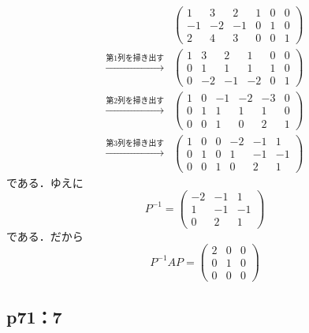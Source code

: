 \documentclass[uplatex,dvipdfmx,a4paper,10pt,fleqn]{jsarticle}
\begin{document}
    \begin{tleftbar}
    \begin{align*} 
    &
    \left( 
        \begin{array}{ccc|ccc}
        1 & 3 & 2 & 1 & 0 & 0 \\
        -1 & -2 & -1 & 0 & 1 & 0 \\
        2 & 4 & 3 &  0 & 0 & 1
        \end{array}
        \right) \\
       \xrightarrow{\text{第$1$列を掃き出す}} &
    \left( 
        \begin{array}{ccc|ccc}
        1 & 3 & 2 & 1 & 0 & 0 \\
        0 & 1 & 1 & 1 & 1 & 0 \\
        0 & -2 & -1 &  -2 & 0 & 1
        \end{array}
        \right) \\
       \xrightarrow{\text{第$2$列を掃き出す}} &
       \left( 
           \begin{array}{ccc|ccc}
           1 & 0 & -1 & -2 & -3 & 0 \\
           0 & 1 & 1 & 1 & 1 & 0 \\
           0 & 0 & 1 &  0 & 2 & 1 
           \end{array}
           \right) \\
       \xrightarrow{\text{第$3$列を掃き出す}} &
       \left( 
           \begin{array}{ccc|ccc}
            1 & 0 & 0 & -2 & -1 & 1 \\
            0 & 1 & 0 & 1 & -1 & -1 \\
            0 & 0 & 1 &  0 & 2 & 1 
           \end{array}
           \right) 
        \end{align*}
        である．ゆえに
        \[
            P^{-1} = \begin{pmatrix} -2 & -1 & 1\\ 1 & -1 & -1 \\ 0 & 2 & 1 \end{pmatrix}
        \]
        である．だから
        \[
            P^{-1} A P = \begin{pmatrix} 2 & 0 & 0 \\ 0 & 1 & 0 \\ 0 & 0 & 0 \end{pmatrix}
        \]
    \end{tleftbar}

\subsection*{p71：7}
\end{document}
